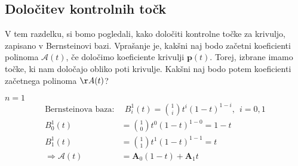 \documentclass[mat1]{fmfdelo}
\newcommand{\pp}{\boldsymbol p}
\newcommand{\A}{\mathcal A}
\begin{document}
\subsection{Določitev kontrolnih točk}
V tem razdelku, si bomo pogledali, kako določiti kontrolne točke za krivuljo, zapisano v Bernsteinovi bazi. Vprašanje je, kakšni naj bodo začetni koeficienti polinoma $\A(t)$, če določimo koeficiente krivulji $\pp(t)$. Torej, izbrane imamo točke, ki nam določajo obliko poti krivulje. Kakšni naj bodo potem koeficienti začetnega polinoma $\AA(t)$?
\begin{primer}
$n=1$
\begin{equation*}
\begin{split}
\text{Bernsteinova baza}:&~~ B_i^1(t) = \binom{1}{i} t^i(1-t)^{1-i}, ~~ i= 0,1 \\
B_0^1(t) &= \binom{1}{0} t^0(1-t)^{1-0} = 1-t \\
B_1^1(t) &= \binom{1}{1} t^1(1-t)^{1-1} = t \\
\Longrightarrow \A(t) &= \boldsymbol{A}_0(1-t) + \boldsymbol{A}_1t
\end{split}
\end{equation*}


\end{primer}
\end{document}
